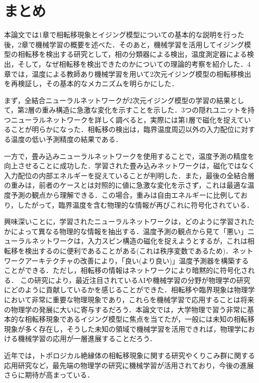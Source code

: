 \documentclass[a4paper,11pt]{jsreport}
\begin{document}
\chapter*{まとめ}
本論文では1章で相転移現象とイジング模型についての基本的な説明を行った後，2章で機械学習の概要を述べた．そのあと，機械学習を活用してイジング模型の相転移を検出する研究として，相の分類器による検出，温度測定器による検出，そして，なぜ相転移を検出できたのかについての理論的考察を紹介した．4章では，温度による教師あり機械学習を用いて2次元イジング模型の相転移検出を再検証し，その基本的なメカニズムを明らかにした．\par
まず，全結合ニューラルネットワークが2次元イジング模型の学習の結果として，第2層の重み構造に急激な変化を示すことを示した．3つの隠れユニットを持つニューラルネットワークを詳しく調べると，実際には第1層で磁化を捉えていることが明らかになった．相転移の検出は，臨界温度周辺以外の入力配位に対する温度の低い予測精度の結果である．\par
一方で，畳み込みニューラルネットワークを使用することで，温度予測の精度を向上させることに成功した．学習された畳み込みネットワークは，磁化ではなく入力配位の内部エネルギーを捉えていることが判明した．また，最後の全結合層の重みは，前者のケースとは対照的に値に急激な変化を示さず，これは最適な温度予測の観点から理解できる．この場合，重みは自由エネルギーに比例しており，したがって，臨界温度を含む物理的な情報が再びこれに符号化されている．\par
興味深いことに，学習されたニューラルネットワークは，どのように学習されたかによって異なる物理的な情報を抽出する．温度予測の観点から見て「悪い」ニューラルネットワークは，入力スピン構造の磁化を捉えようとするが，これは相転移を検出するのに便利であることがある(これは秩序変数であるため)．ネットワークアーキテクチャの改善により，「良い(より良い)」温度予測器を構築することができる．ただし，相転移の情報はネットワークにより暗黙的に符号化される．
この研究により，最近注目されているAIや機械学習の分野が物理学の研究にどのように貢献しているかを感じることができた．相転移や臨界現象は物理学において非常に重要な物理現象であり，これらを機械学習で応用することは将来の物理学の発展に大いに寄与するだろう．本論文では，大学物理で習う非常に基本的な相転移現象であるイジング模型に焦点を当てたが，一般には未知の相転移現象が多く存在し，そうした未知の領域で機械学習を活用できれば，物理学における機械学習の応用が一層進展することだろう．\par
近年では，トポロジカル絶縁体の相転移現象に関する研究やくりこみ群に関する応用研究など，最先端の物理学の研究に機械学習が活用されており，今後の進展さらに期待が高まっている．
\end{document}
